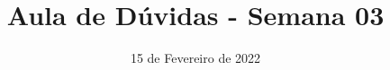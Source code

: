 \documentclass{beamer}
\title{Aula de Dúvidas - Semana 03}
\author[\autor]{\autor}
\institute[\instituto]{\instituto}
\date{15 de Fevereiro de 2022}
\begin{document}
    \begin{frame}
        \maketitle
    \end{frame}
\end{document}
